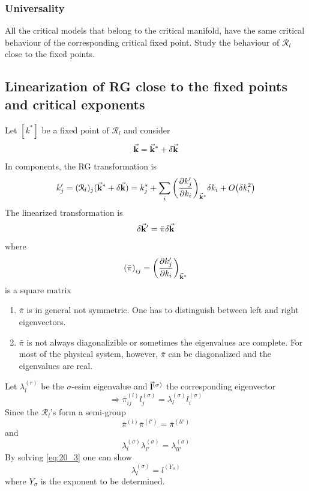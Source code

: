 \documentclass[../main/main.tex]{subfiles}
\begin{document}
\subsubsection{Universality}
All the critical models that belong to the critical manifold, have the same critical behaviour of the corresponding critical fixed point. Study the behaviour of \( \mathcal{R}_l \) close to the fixed points.

\subsection{Linearization of RG close to the fixed points and critical exponents}
Let \( [k^*] \) be a fixed point of \( \mathcal{R}_l \) and consider
\begin{equation}
  \va{k} = \va{k}^* + \delta \va{k}
\end{equation}
In components, the RG transformation is
\begin{equation}
  k'_j = (\mathcal{R}_l)_j (\va{k}^*+ \delta \va{k} )
= k^*_j + \sum_{i}^{} \qty(\pdv{k_j'}{k_i} )_{\va{k}^*} \delta k_i + O \qty(\delta k_i^2)
\end{equation}
The linearized transformation is
\begin{equation}
  \delta \va{k}' = \bar{\pi } \delta \va{k}
\end{equation}
where
\begin{equation}
  \qty(\bar{\pi } )_{ij} = \qty(\pdv{k_j'}{k_i} )_{\va{k}^*}
\end{equation}
is a square matrix
\begin{enumerate}
\item \( \bar{\pi }  \) is in general not symmetric. One has to distinguish between left and right eigenvectors.
\item \( \bar{\pi }  \) is not always diagonalizible or sometimes the eigenvalues are complete. For most of the physical system, however, \( \bar{\pi }  \) can be diagonalized and the eigenvalues are real.
\end{enumerate}
Let \( \lambda _l^{(r)} \) be the \( \sigma  \)-esim eigenvalue and \( \va{l}^{(\sigma )} \) the corresponding eigenvector
\begin{equation}
  \Rightarrow \bar{\pi }^{(l)}_{ij} l^{(\sigma )}_j = \lambda _l^{(\sigma )} l_i ^{(\sigma )}
\end{equation}
Since the \( \mathcal{R}_l \)'s form a semi-group
\begin{equation}
  \bar{\pi }^{(l)} \bar{\pi }^{(l')} = \bar{\pi }^{(ll')}
\end{equation}
and
\begin{equation}
  \lambda _l^{(\sigma )} \lambda _{l'}^{(\sigma )} =  \lambda _{ll'}^{(\sigma )}
  \label{eq:20_3}
\end{equation}
By solving \eqref{eq:20_3} one can show
\begin{equation}
   \lambda _{l}^{(\sigma )} = l^{(Y_\sigma)}
\end{equation}
where \( Y_\sigma \) is the exponent to be determined.
\end{document}

